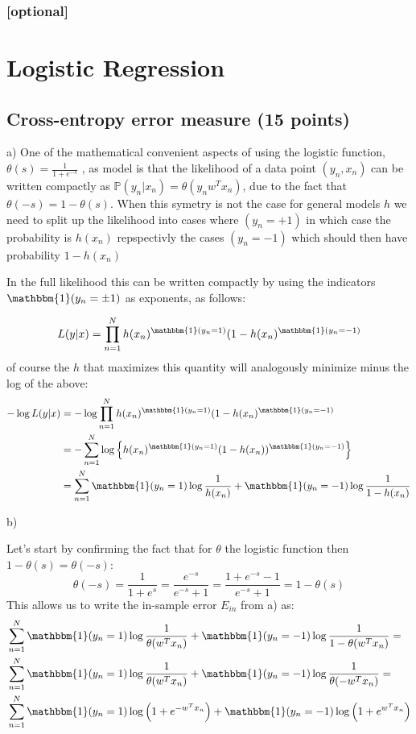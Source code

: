 \documentclass[a4paper,12pt]{article}
\begin{document}
\subsubsection{[optional]} %

\section{Logistic Regression}



\subsection{Cross-entropy error measure (15 points)}
a)
One of the mathematical convenient aspects of using the logistic function, $\theta(s) = \frac{1}{1 + e^{-s}}$ ,  as model is that the likelihood of a data point $(y_n, x_n)$ can be written compactly as $\mathbb{P}(y_n|x_n) = \theta(y_n w^Tx_n)$, due to the fact that $\theta(-s) = 1-\theta(s)$. When this symetry is not the case for general models $h$ we need to split up the likelihood into cases where $(y_n = +1)$ in which case the probability is $h(x_n)$ repspectivly the cases $(y_n = -1)$ which should then have probability $1-h(x_n)$

In the full likelihood this can be written compactly by using the indicators $\mathbbm{1}(y_n = \pm 1)$ as exponents, as follows: 

$$
L(y|x) = \prod_{n = 1}^Nh(x_n)^{\mathbbm{1}(y_n = 1)}(1-h(x_n)^{\mathbbm{1}(y_n = -1)}
$$
of course the $h$ that maximizes this quantity will analogously minimize minus the log of the above:
\begin{align*}
-\log L(y|x) &= -\log \prod_{n = 1}^Nh(x_n)^{\mathbbm{1}(y_n = 1)}(1-h(x_n)^{\mathbbm{1}(y_n = -1)}  \\
&=-\sum_{n=1}^N \log \left\{ h(x_n)^{\mathbbm{1}(y_n = 1)}  (1-h(x_n))^{\mathbbm{1}(y_n = -1)} \right\} \\
&=\sum_{n=1}^N \mathbbm{1}(y_n = 1) \log \frac{1}{h(x_n)}  + 
\mathbbm{1}(y_n = -1)\log\frac{1}{1-h(x_n)}
\end{align*}

b)

Let's start by confirming the fact that for $\theta$ the logistic function then $1-\theta(s) = \theta(-s)$:
$$
\theta(-s) = \frac{1}{1+e^{s}} = \frac{e^{-s}}{e^{-s} + 1} = \frac{1+e^{-s}-1}{e^{-s} + 1} = 1- \theta(s)
$$
This allows us to write the in-sample error $E_{in}$ from a) as:
\begin{align*}
&\sum_{n=1}^N \mathbbm{1}(y_n = 1) \log \frac{1}{\theta(w^Tx_n)}  + 
\mathbbm{1}(y_n = -1)\log\frac{1}{1-\theta(w^Tx_n)} = \\
%
&\sum_{n=1}^N \mathbbm{1}(y_n = 1) \log \frac{1}{\theta(w^Tx_n)}  + 
\mathbbm{1}(y_n = -1)\log\frac{1}{\theta(-w^Tx_n)} = \\
%
&\sum_{n=1}^N \mathbbm{1}(y_n = 1) \log \left(1+e^{-w^Tx_n} \right)  + 
\mathbbm{1}(y_n = -1)\log \left(1+e^{w^Tx_n} \right)  
\end{align*}
\end{document}
